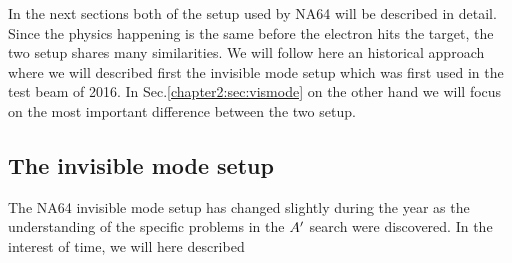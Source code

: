 In the next sections both of the setup used by NA64 will be described in detail. Since the physics happening is the same before the electron hits the target, the two setup shares many similarities. We will follow here an historical approach where we will described first the invisible mode setup which was first used in the test beam of 2016. In Sec.\ref{chapter2:sec:vismode} on the other hand we will focus on the most important difference between the two setup.

\subsection{The invisible mode setup}
\label{chapter2:sec:invismode}

The NA64 invisible mode setup has changed slightly during the year as the understanding of the specific problems in the $A'$ search were discovered. In the interest of time, we will here described 

